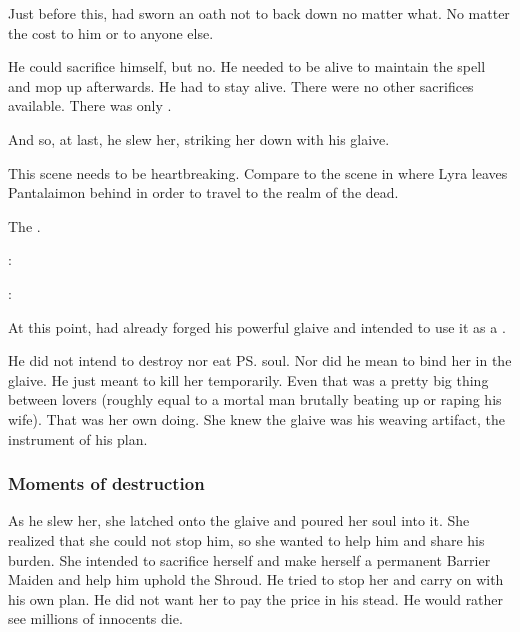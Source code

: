 Just before this, \Ishnaruchaefir had sworn an oath not to back down no matter what. 
No matter the cost to him or to anyone else. 

He could sacrifice himself, but no. 
He needed to be alive to maintain the spell and mop up afterwards. 
He had to stay alive. 
There were no other sacrifices available. 
There was only \Rystessakhin. 

And so, at last, he slew her, striking her down with his glaive.

This scene needs to be heartbreaking. 
Compare to the scene in \cite{PhillipPullman:TheAmberSpyglass} where Lyra leaves Pantalaimon behind in order to travel to the realm of the dead. 

The \dragons {}. 

\begin{prose}
  \Ishnaruchaefir:
  
  \Rystessakhin:
\end{prose}

At this point, \Ishnaruchaefir{} had already forged his powerful glaive and intended to use it as a . 

He did not intend to destroy nor eat \ps{\Aeocrith} soul. 
Nor did he mean to bind her in the glaive. 
He just meant to kill her temporarily. 
Even that was a pretty big thing between lovers (roughly equal to a mortal man brutally beating up or raping his wife). 
That was her own doing. 
She knew the glaive was his weaving artifact, the instrument of his plan.





\subsubsection{Moments of destruction}
As he slew her, she latched onto the glaive and poured her soul into it. 
She realized that she could not stop him, so she wanted to help him and share his burden. 
She intended to sacrifice herself and make herself a permanent Barrier Maiden and help him uphold the Shroud. 
He tried to stop her and carry on with his own plan. 
He did not want her to pay the price in his stead. 
He would rather see millions of innocents die. 

